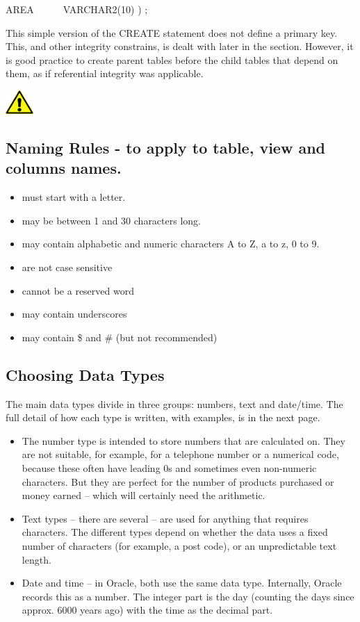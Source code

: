 AREA\ \ \ \ \ \ VARCHAR2(10)  ) ;

This simple version of the CREATE statement does not define a primary key. This, and other integrity constrains, is dealt with later in the section. However, it is good practice to create {\textquotedbl}parent{\textquotedbl} tables before the {\textquotedbl}child{\textquotedbl} tables that depend on them, as if referential integrity was applicable.

\begin{center}
  
\includegraphics[width=1.06cm,height=0.903cm]{images/img (2).png}

\end{center}
\subsection[Naming Rules {}- to apply to table, view and columns names.]{Naming Rules - to apply to table, view and columns names.}
\begin{itemize}
\item must start with a letter.
\item may be between 1 and 30 characters long.
\item may contain alphabetic and numeric characters  A to Z, a to z, 0 to 9.
\item are not case sensitive
\item cannot be a reserved word
\item may contain underscores
\item may contain \$ and \#  (but not recommended)
\end{itemize}
\subsection[Choosing Data Types]{Choosing Data Types}
The main data types divide in three groups: numbers, text and date/time. The full detail of how each type is written, with examples, is  in the next page.

\begin{itemize}
\item The number type is intended to store numbers that are calculated on. They are not suitable, for example, for a telephone number or a numerical code, because these often have leading 0s and sometimes even non-numeric characters. But they are perfect for the number of products purchased or money earned -- which will certainly need the arithmetic.
\item Text types -- there are several -- are used for anything that requires characters. The different types depend on whether the data uses a fixed number of characters (for example, a post code), or an unpredictable text length.
\item Date and time -- in Oracle, both use the same data type. Internally, Oracle records this as a number. The integer part is the day (counting the days since approx. 6000 years ago) with the time as the decimal part.
\end{itemize}


